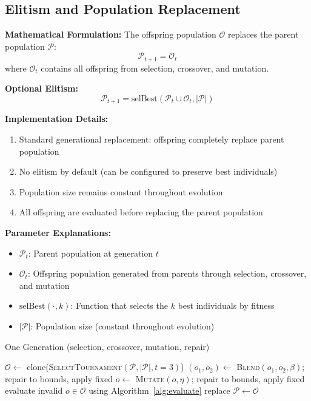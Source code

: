 \documentclass[12pt,a4paper]{article}
\begin{document}
\subsection{Elitism and Population Replacement}
\textbf{Mathematical Formulation:}
The offspring population $\mathcal{O}$ replaces the parent population $\mathcal{P}$:
\begin{equation}
\mathcal{P}_{t+1} = \mathcal{O}_t \label{eq:generational_replacement}
\end{equation}
where $\mathcal{O}_t$ contains all offspring from selection, crossover, and mutation.

\textbf{Optional Elitism:}
\begin{equation}
\mathcal{P}_{t+1} = \text{selBest}(\mathcal{P}_t \cup \mathcal{O}_t, |\mathcal{P}|) \label{eq:elitist_replacement}
\end{equation}

\textbf{Implementation Details:}
\begin{enumerate}
\item Standard generational replacement: offspring completely replace parent population
\item No elitism by default (can be configured to preserve best individuals)
\item Population size remains constant throughout evolution
\item All offspring are evaluated before replacing the parent population
\end{enumerate}

\textbf{Parameter Explanations:}
\begin{itemize}
\item $\mathcal{P}_t$: Parent population at generation $t$
\item $\mathcal{O}_t$: Offspring population generated from parents through selection, crossover, and mutation
\item $\text{selBest}(\cdot, k)$: Function that selects the $k$ best individuals by fitness
\item $|\mathcal{P}|$: Population size (constant throughout evolution)
\end{itemize}

\begin{algorithm}[H]
\caption{One Generation (selection, crossover, mutation, repair)}
\begin{algorithmic}[1]
\State $\mathcal{O} \leftarrow$ clone(\textsc{SelectTournament}$(\mathcal{P},|\mathcal{P}|,t=3)$)
 \State $(o_1,o_2) \leftarrow$ \textsc{Blend}$(o_1,o_2,\beta)$; repair to bounds, apply fixed \EndIf
\EndFor
{}
 \State $o\leftarrow$ \textsc{Mutate}$(o,\eta)$; repair to bounds, apply fixed \EndIf
\EndFor
\State evaluate invalid $o\in\mathcal{O}$ using Algorithm~\ref{alg:evaluate}
\State replace $\mathcal{P}\leftarrow\mathcal{O}$
\end{algorithmic}
\end{algorithm}
\end{document}
